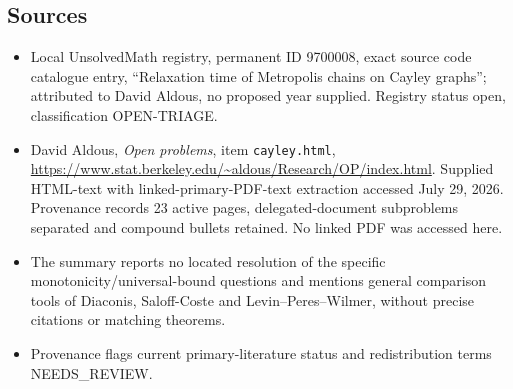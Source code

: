 \documentclass[11pt]{article}
\begin{document}
\subsection{Sources}
\begin{itemize}
\item Local UnsolvedMath registry, permanent ID 9700008, exact source code catalogue entry, ``Relaxation time of Metropolis chains on Cayley graphs''; attributed to David Aldous, no proposed year supplied. Registry status open, classification OPEN-TRIAGE.
\item David Aldous, \emph{Open problems}, item \texttt{cayley.html}, \url{https://www.stat.berkeley.edu/~aldous/Research/OP/index.html}. Supplied HTML-text with linked-primary-PDF-text extraction accessed July 29, 2026. Provenance records 23 active pages, delegated-document subproblems separated and compound bullets retained. No linked PDF was accessed here.
\item The summary reports no located resolution of the specific monotonicity/universal-bound questions and mentions general comparison tools of Diaconis, Saloff-Coste and Levin--Peres--Wilmer, without precise citations or matching theorems.
\item Provenance flags current primary-literature status and redistribution terms NEEDS\_REVIEW.
\end{itemize}
\end{document}

